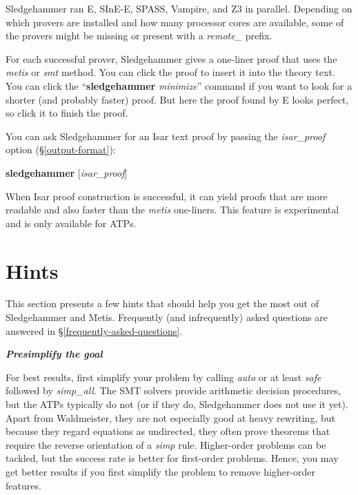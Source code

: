 \documentclass[a4paper,12pt]{article}
\begin{document}
Sledgehammer ran E, SInE-E, SPASS, Vampire, %
and Z3 in parallel.
Depending on which provers are installed and how many processor cores are
available, some of the provers might be missing or present with a
\textit{remote\_} prefix.

For each successful prover, Sledgehammer gives a one-liner proof that uses the
\textit{metis} or \textit{smt} method. You can click the proof to insert it into
the theory text. You can click the ``\textbf{sledgehammer} \textit{minimize}''
command if you want to look for a shorter (and probably faster) proof. But here
the proof found by E looks perfect, so click it to finish the proof.

You can ask Sledgehammer for an Isar text proof by passing the
\textit{isar\_proof} option (\S\ref{output-format}):

\prew
\textbf{sledgehammer} [\textit{isar\_proof}]
\postw

When Isar proof construction is successful, it can yield proofs that are more
readable and also faster than the \textit{metis} one-liners. This feature is
experimental and is only available for ATPs.

\section{Hints}
\label{hints}

This section presents a few hints that should help you get the most out of
Sledgehammer and Metis. Frequently (and infrequently) asked questions are
answered in \S\ref{frequently-asked-questions}.

\newcommand\point[1]{\medskip\par{\sl\bfseries#1}\par\nopagebreak}

\point{Presimplify the goal}

For best results, first simplify your problem by calling \textit{auto} or at
least \textit{safe} followed by \textit{simp\_all}. The SMT solvers provide
arithmetic decision procedures, but the ATPs typically do not (or if they do,
Sledgehammer does not use it yet). Apart from Waldmeister, they are not
especially good at heavy rewriting, but because they regard equations as
undirected, they often prove theorems that require the reverse orientation of a
\textit{simp} rule. Higher-order problems can be tackled, but the success rate
is better for first-order problems. Hence, you may get better results if you
first simplify the problem to remove higher-order features.
\end{document}
